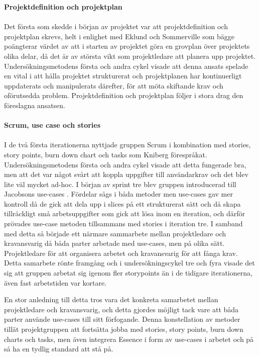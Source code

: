 \documentclass[conference,a4paper]{IEEEtran}
\begin{document}
\noindent \textbf{Projektdefinition och projektplan}\\
\\
Det första som skedde i början av projektet var att projektdefinition och projektplan skrevs, helt i enlighet med Eklund \cite[s. 138-139]{Eklund14} och Sommerville \cite[s. 619]{Sommerville10} som bägge poängterar värdet av att i starten av projektet göra en grovplan över projektets olika delar, då det är av största vikt som projektledare att planera upp projektet. Undersökningsmetodens första och andra cykel visade att denna ansats spelade en vital i att hålla projektet strukturerat och projektplanen har kontinuerligt uppdaterats och manipulerats därefter, för att möta skiftande krav och oförutsedda problem. Projektdefinition och projektplan följer i stora drag den föreslagna ansatsen.\\
\\
\textbf{Scrum, use case och stories}\\
\\
I de två första iterationerna nyttjade gruppen Scrum i kombination med stories, story points, burn down chart och tasks som Kniberg \cite{Kniberg07} förespråkat. Undersökningsmetodens första och andra cykel visade att detta fungerade bra, men att det var något svårt att koppla uppgifter till användarkrav och det blev lite väl mycket ad-hoc. I början av sprint tre blev gruppen introducerad till Jacobsons use-cases \cite{Jacobson11}. Fördelar sågs i båda metoder men use-cases gav mer kontroll då de gick att dela upp i slices på ett strukturerat sätt och då skapa tillräckligt små arbetsuppgifter som gick att lösa inom en iteration, och därför prövades use-case metoden tillsammans med stories i iteration tre. I samband med detta så började ett närmare sammarbete mellan projektledare och kravansvarig då båda parter arbetade med use-cases, men på olika sätt. Projektledare för att organisera arbetet och kravansvarig för att fånga krav. Detta samarbete rönte framgång och i undersökningscykel tre och fyra visade det sig att gruppen arbetat sig igenom fler storypoints än i de tidigare iterationerna, även fast arbetstiden var kortare.

En stor anledning till detta tros vara det konkreta samarbetet mellan projektledare och kravansvarig, och detta gjordes möjligt tack vare att båda parter använde use-cases till sitt förfogande. Denna konstellation av metoder tillät projektgruppen att fortsätta jobba med stories, story points, burn down charts och tasks, men även integrera Essence \cite{Jacobson13} i form av use-cases i arbetet och på så ha en tydlig standard att stå på.
\end{document}
